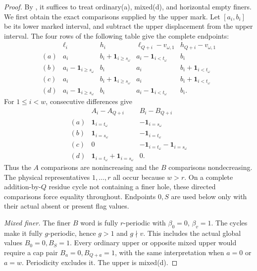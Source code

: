 \documentclass[11pt,a4paper]{amsart}
\numberwithin{equation}{section}
\theoremstyle{plain}
\theoremstyle{definition}
\newcommand{\one}{\mathbf1}
\begin{document}
\begin{proof}
By , it suffices to treat ordinary(a), mixed(d), and horizontal empty finers.  We first obtain the exact comparisons supplied by the upper mark.  Let \([a_i,b_i]\) be its lower marked interval, and subtract the upper displacement from the upper interval.  The four rows of the following table give the complete endpoints:
\begin{equation}\label{rt:upper-intervals}
\begin{array}{c|cc|cc}
 &\ell_i&h_i&\ell_{Q+i}-v_{\omega,1}&h_{Q+i}-v_{\omega,1}\\\hline
 (a)&a_i&b_i+\one_{i\ge s_\omega}&a_i-\one_{i<t_\omega}&b_i\\
 (b)&a_i-\one_{i\ge s_\omega}&b_i&a_i&b_i+\one_{i<t_\omega}\\
 (c)&a_i&b_i+\one_{i\ge s_\omega}&a_i&b_i+\one_{i<t_\omega}\\
 (d)&a_i-\one_{i\ge s_\omega}&b_i&a_i-\one_{i<t_\omega}&b_i.
\end{array}
\end{equation}
For \(1\le i<w\), consecutive differences give
\begin{equation}\label{rt:upper-charges}
\begin{array}{c|cc}
 &A_i-A_{Q+i}&B_i-B_{Q+i}\\\hline
 (a)&\one_{i=t_\omega}&-\one_{i=s_\omega}\\
 (b)&\one_{i=s_\omega}&-\one_{i=t_\omega}\\
 (c)&0&-\one_{i=t_\omega}-\one_{i=s_\omega}\\
 (d)&\one_{i=t_\omega}+\one_{i=s_\omega}&0.
\end{array}
\end{equation}
Thus the \(A\) comparisons are nonincreasing and the \(B\) comparisons nondecreasing.  The physical representatives \(1,\ldots,r\) all occur because \(w>r\).  On a complete addition-by-\(Q\) residue cycle not containing a finer hole, these directed comparisons force equality throughout.  Endpoints \(0,S\) are used below only with their actual absent or present flag values.

\smallskip\noindent\emph{Mixed finer.}
The finer \(B\) word is fully \(r\)-periodic with \(\beta_0=0\), \(\beta_v=1\).  The cycles make it fully \(g\)-periodic, hence \(g>1\) and \(g\nmid v\).  This includes the actual global values \(B_0=0,B_S=1\).  Every ordinary upper or opposite mixed upper would require a cap pair \(B_a=0,B_{Q+a}=1\), with the same interpretation when \(a=0\) or \(a=w\).  Periodicity excludes it.  The upper is mixed(d).


\end{proof}
\end{document}
